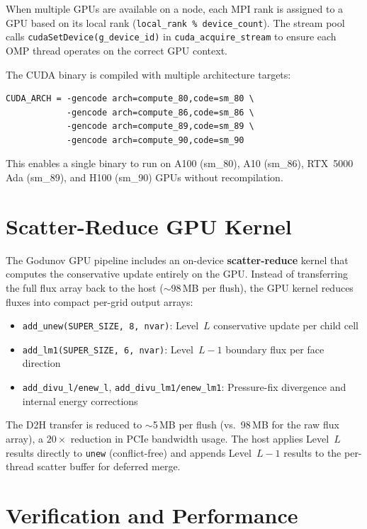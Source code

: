 \documentclass[11pt,fleqn]{book}
\begin{document}
When multiple GPUs are available on a node, each MPI rank is assigned to a GPU based on its local rank (\texttt{local\_rank \% device\_count}).  The stream pool calls \texttt{cudaSetDevice(g\_device\_id)} in \texttt{cuda\_acquire\_stream} to ensure each OMP thread operates on the correct GPU context.

The CUDA binary is compiled with multiple architecture targets:
\begin{lstlisting}[basicstyle=\small\ttfamily,frame=single]
CUDA_ARCH = -gencode arch=compute_80,code=sm_80 \
            -gencode arch=compute_86,code=sm_86 \
            -gencode arch=compute_89,code=sm_89 \
            -gencode arch=compute_90,code=sm_90
\end{lstlisting}
This enables a single binary to run on A100 (sm\_80), A10 (sm\_86), RTX~5000 Ada (sm\_89), and H100 (sm\_90) GPUs without recompilation.

\section{Scatter-Reduce GPU Kernel}

The Godunov GPU pipeline includes an on-device \textbf{scatter-reduce} kernel that computes the conservative update entirely on the GPU.  Instead of transferring the full flux array back to the host ($\sim$98\,MB per flush), the GPU kernel reduces fluxes into compact per-grid output arrays:

\begin{itemize}[nosep]
\item \texttt{add\_unew(SUPER\_SIZE, 8, nvar)}: Level~$L$ conservative update per child cell
\item \texttt{add\_lm1(SUPER\_SIZE, 6, nvar)}: Level~$L{-}1$ boundary flux per face direction
\item \texttt{add\_divu\_l/enew\_l}, \texttt{add\_divu\_lm1/enew\_lm1}: Pressure-fix divergence and internal energy corrections
\end{itemize}

The D2H transfer is reduced to $\sim$5\,MB per flush (vs.\ 98\,MB for the raw flux array), a $20\times$ reduction in PCIe bandwidth usage.  The host applies Level~$L$ results directly to \texttt{unew} (conflict-free) and appends Level~$L{-}1$ results to the per-thread scatter buffer for deferred merge.

\section{Verification and Performance}
\end{document}
